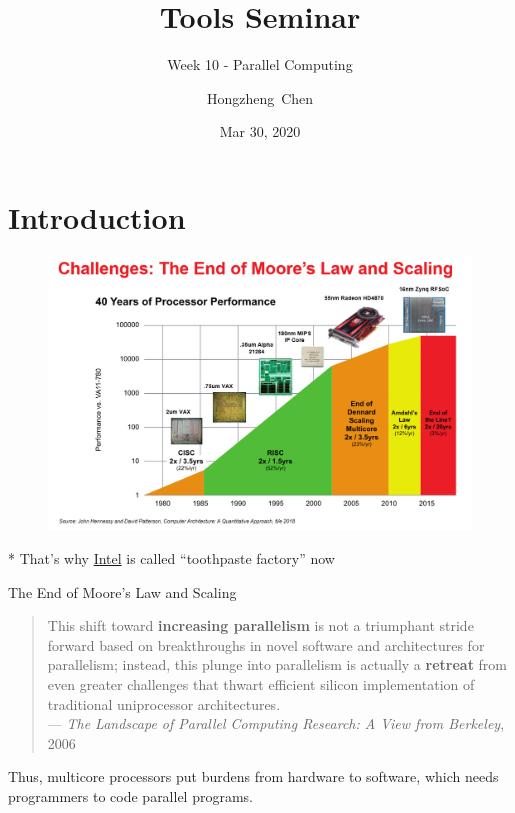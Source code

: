 \documentclass{../TexTemplate/myslide}
\title[ToolsSeminar]{Tools Seminar}
\subtitle{Week 10 - Parallel Computing}
\author[chhzh123]{Hongzheng~Chen}
\date[Mar 30, 2020]{Mar 30, 2020}
\begin{document}
\begin{frame}
\titlepage
\end{frame}

\begin{frame}
\tableofcontents
\end{frame}

\section{Introduction}
\begin{frame}
\sectionpage
\end{frame}

\begin{frame}
\begin{figure}
\centering
\includegraphics[width=\linewidth]{fig/the_end_of_moores_law_and_scaling.png}
\end{figure}
* That's why \href{https://en.wikipedia.org/wiki/Tick\%E2\%80\%93tock_model}{Intel} is called ``toothpaste factory'' now
\end{frame}

\begin{frame}{The End of Moore's Law and Scaling}
\begin{quote}
This shift toward \textbf{increasing parallelism} is not a triumphant stride forward based on breakthroughs in novel software and architectures for parallelism;
instead, this plunge into parallelism is actually a \textbf{retreat} from even greater challenges that thwart efficient silicon implementation of traditional uniprocessor architectures.\\
\hfill ---  \emph{The Landscape of Parallel Computing Research: A View from Berkeley}, 2006
\end{quote}
\pause
Thus, multicore processors put burdens from hardware to software, which needs programmers to code parallel programs.
\end{frame}
\end{document}
